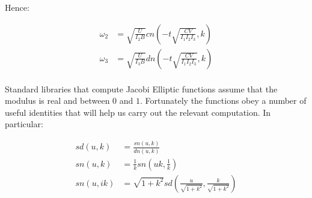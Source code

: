 \documentclass[a4paper, 12pt]{article}
\begin{document}
Hence:

\begin{align}
  \omega_2 &=\sqrt{\frac{U}{I_2B}}cn(-t\sqrt{\frac{CV}{I_1I_2I_3}}, k) \\
  \omega_3 &=\sqrt{\frac{U}{I_3B}}dn(-t\sqrt{\frac{CV}{I_1I_2I_3}}, k) \\
\end{align}

Standard libraries that compute Jacobi Elliptic functions assume that the modulus is real and between $0$ and $1$. Fortunately the functions obey a number of useful identities that will help us carry out the relevant computation. In particular:

\begin{align}
  sd(u, k) &= \frac{sn(u, k)}{dn(u, k)} \\
  sn(u, k) &= \frac{1}{k}sn( uk, \frac{1}{k}) \\
  sn(u, ik) &= \sqrt{1 + k^2} sd(\frac{u}{\sqrt{1 + k^2}}, \frac{k}{\sqrt{1+k^2}})
\end{align}



\end{document}

